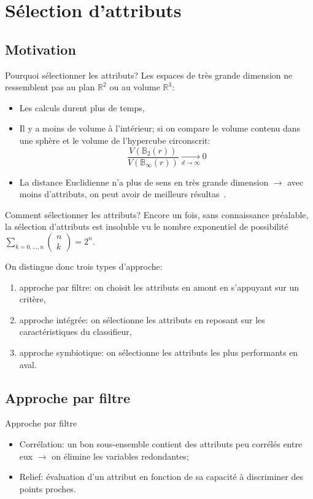\documentclass[8pt]{beamer}
\begin{document}
	\section[feature selection]{Sélection d'attributs}
	\subsection[motivation]{Motivation}
	\begin{frame}{Pourquoi sélectionner les attributs?}
		Les espaces de très grande dimension ne ressemblent pas au plan $\mathbb{R}^2$ ou au volume  $\mathbb{R}^3$:
		\begin{itemize}
			\item <1-> Les calculs durent plus de temps,
			\item <2-> Il y a moins de volume à l'intérieur; si on compare le volume contenu dans une sphère et le volume de l'hypercube circonscrit:
			$$\frac{V(\mathbb{B}_{2}(r))}{V(\mathbb{B}_{\infty}(r))}\xrightarrow[d \to \infty]{} 0$$
			\item <3-> La distance Euclidienne n'a plus de sens en très grande dimension $\longrightarrow$ avec moins d'attributs, on peut avoir de meilleurs résultas~\cite{Domingos:2012:FUT:2347736.2347755}.
		\end{itemize}
	\end{frame}

	\begin{frame}{Comment sélectionner les attributs?}
		Encore un fois, sans connaissance préalable, la sélection d'attributs est insoluble vu le nombre exponentiel de possibilité $\sum_{k=0,\dots,n} \begin{pmatrix}
		n\\
		k
		\end{pmatrix} = 2^n$.

		On distingue donc trois types d'approche:
		\begin{enumerate}
			\item<1-> approche par filtre: on choisit les attributs en amont en s'appuyant sur un critère,
			\item<2-> approche intégrée: on sélectionne les attributs en reposant sur les caractéristiques du classifieur,
			\item<3-> approche symbiotique: on sélectionne les attributs les plus performants en aval.
		\end{enumerate}
	\end{frame}

	\subsection[filter approach]{Approche par filtre}
	\begin{frame}{Approche par filtre}
		\begin{itemize}
			\item  Corrélation: un bon sous-ensemble contient des attributs peu corrélés entre eux $\longrightarrow$ on élimine les variables redondantes;
			\item  Relief: évaluation d'un attribut en fonction de sa capacité à discriminer des points proches.
		\end{itemize}
	\end{frame}
\end{document}
